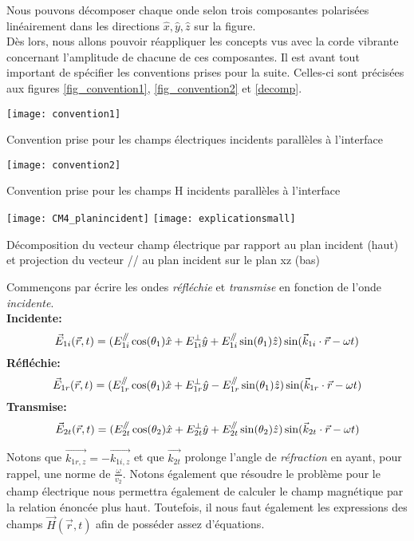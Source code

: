 Nous pouvons décomposer chaque onde selon trois composantes polarisées linéairement dans les directions $\hat{x}, \hat{y}, \hat{z}$ sur la figure. \\
Dès lors, nous allons pouvoir réappliquer les concepts vus avec la corde vibrante concernant l'amplitude de chacune de ces composantes. Il est avant tout important de spécifier les conventions prises pour la suite. Celles-ci sont précisées aux figures \ref{fig_convention1}, \ref{fig_convention2} et \ref{decomp}.
\begin{marginfigure}[-4cm]
\texttt{[image: convention1]}
\caption{Convention prise pour les champs électriques incidents parallèles à l'interface}
\label{fig_convention1}
\end{marginfigure}
\begin{marginfigure}
\texttt{[image: convention2]}
\caption{Convention prise pour les champs H incidents parallèles à l'interface}
\label{fig_convention2}
\end{marginfigure}
\begin{marginfigure}
\texttt{[image: CM4\_planincident]}
\texttt{[image: explicationsmall]}
\caption{Décomposition du vecteur champ électrique par rapport au plan incident (haut) et projection du vecteur // au plan incident sur le plan xz (bas)}
\label{decomp}
\end{marginfigure}
 Commençons par écrire les ondes \textit{réfléchie} et \textit{transmise} en fonction de l'onde \textit{incidente}.\\
\textbf{Incidente:} $$ \vec{E}_{1i} (\vec{r},t) = (E^{\mathbin{/\mkern-5mu/}}_{1i} \cos(\theta_{1})  \hat{x} + E_{1i}^{\perp} \hat{y} + E_{1i}^{\mathbin{/\mkern-5mu/}} \sin(\theta_{1}) \hat{z} ) \sin(\vec{k}_{1i}\cdot \vec{r} - \omega t) $$  
\textbf{Réfléchie:}  $$ \vec{E}_{1r} (\vec{r},t) = (E^{\mathbin{/\mkern-5mu/}}_{1r} \cos(\theta_{1})  \hat{x} + E_{1r}^{\perp} \hat{y} - E_{1r}^{\mathbin{/\mkern-5mu/}} \sin(\theta_{1}) \hat{z} ) \sin(\vec{k}_{1r}\cdot \vec{r} - \omega t) $$
\textbf{Transmise:}$$ \vec{E}_{2t} (\vec{r},t) = (E^{\mathbin{/\mkern-5mu/}}_{2t} \cos(\theta_{2})  \hat{x} + E_{2t}^{\perp} \hat{y} + E_{2t}^{\mathbin{/\mkern-5mu/}} \sin(\theta_{2}) \hat{z} ) \sin(\vec{k}_{2t}\cdot \vec{r} - \omega t) $$ 
 
Notons que $\vec{k_{1r,z}} = - \vec{k_{1i,z}}$ et que $\vec{k_{2t}}$ prolonge l'angle de \textit{réfraction} en ayant, pour rappel, une norme de $\frac{\omega}{v_{2}}$.
Notons également que résoudre le problème pour le champ électrique nous permettra également de calculer le champ magnétique par la relation énoncée plus haut.
Toutefois, il nous faut également les expressions des champs $\vec{H}(\vec{r},t)$ afin de posséder assez d'équations.

